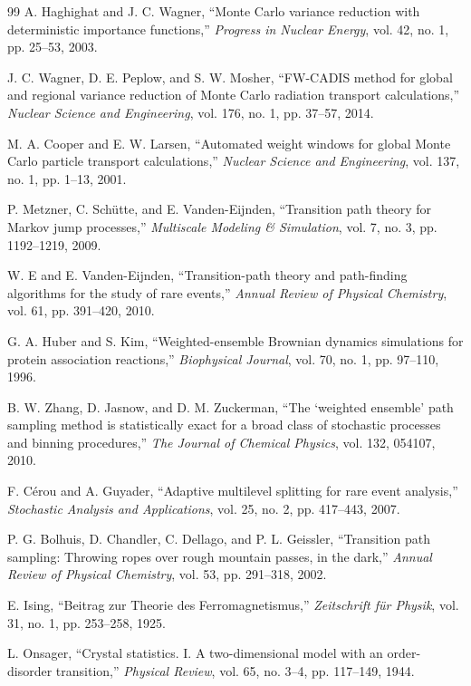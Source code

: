 \documentclass[a4paper,fleqn]{cas-sc}
\begin{document}
\begin{thebibliography}{99}
		A. Haghighat and J. C. Wagner, ``Monte Carlo variance reduction with deterministic importance functions,'' \emph{Progress in Nuclear Energy}, vol. 42, no. 1, pp. 25--53, 2003.
		
		J. C. Wagner, D. E. Peplow, and S. W. Mosher, ``FW-CADIS method for global and regional variance reduction of Monte Carlo radiation transport calculations,'' \emph{Nuclear Science and Engineering}, vol. 176, no. 1, pp. 37--57, 2014.
		
		M. A. Cooper and E. W. Larsen, ``Automated weight windows for global Monte Carlo particle transport calculations,'' \emph{Nuclear Science and Engineering}, vol. 137, no. 1, pp. 1--13, 2001.
		
		P. Metzner, C. Sch\"{u}tte, and E. Vanden-Eijnden, ``Transition path theory for Markov jump processes,'' \emph{Multiscale Modeling \& Simulation}, vol. 7, no. 3, pp. 1192--1219, 2009.
		
		W. E and E. Vanden-Eijnden, ``Transition-path theory and path-finding algorithms for the study of rare events,'' \emph{Annual Review of Physical Chemistry}, vol. 61, pp. 391--420, 2010.
		
		G. A. Huber and S. Kim, ``Weighted-ensemble Brownian dynamics simulations for protein association reactions,'' \emph{Biophysical Journal}, vol. 70, no. 1, pp. 97--110, 1996.
		
		B. W. Zhang, D. Jasnow, and D. M. Zuckerman, ``The `weighted ensemble' path sampling method is statistically exact for a broad class of stochastic processes and binning procedures,'' \emph{The Journal of Chemical Physics}, vol. 132, 054107, 2010.
		
		F. C\'{e}rou and A. Guyader, ``Adaptive multilevel splitting for rare event analysis,'' \emph{Stochastic Analysis and Applications}, vol. 25, no. 2, pp. 417--443, 2007.
		
		P. G. Bolhuis, D. Chandler, C. Dellago, and P. L. Geissler, ``Transition path sampling: Throwing ropes over rough mountain passes, in the dark,'' \emph{Annual Review of Physical Chemistry}, vol. 53, pp. 291--318, 2002.
		
		E. Ising, ``Beitrag zur Theorie des Ferromagnetismus,'' \emph{Zeitschrift f\"{u}r Physik}, vol. 31, no. 1, pp. 253--258, 1925.
		
		L. Onsager, ``Crystal statistics. I. A two-dimensional model with an order-disorder transition,'' \emph{Physical Review}, vol. 65, no. 3--4, pp. 117--149, 1944.
		

\end{thebibliography}
\end{document}
